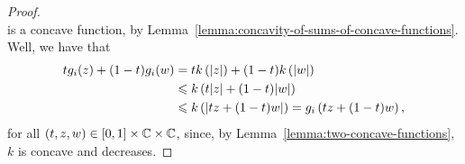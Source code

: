 \begin{proof}
\[  \]
  is a concave function, by
  Lemma~\ref{lemma:concavity-of-sums-of-concave-functions}. Well, we have that
  \begin{align*}
    tg_{i}(z)+(1-t)g_{i}(w)
    &=
    tk\left(\lvert z\rvert\right)+(1-t)k\left(\lvert w\rvert\right)
    \\
    &\leqslant
    k\left(t\lvert z\rvert+(1-t)\lvert w\rvert\right)
    \\
    &\leqslant
    k\left(\lvert tz+(1-t)w\rvert\right)
    =
    g_{i}\left(tz+(1-t)w\right),
  \end{align*}
  for all \((t,z,w)\in{[0,1]\times\mathbb{C}\times\mathbb{C}}\), since,
  by Lemma~\ref{lemma:two-concave-functions}, \(k\) is concave and decreases.
\end{proof}
